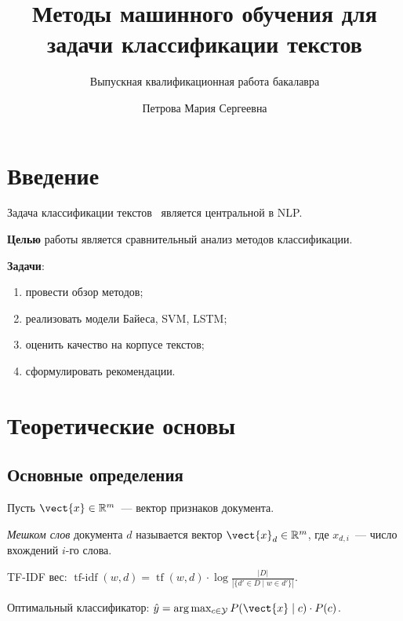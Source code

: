 \documentclass[font=modern]{cmcmsuthesis-bachelor}
\author{Петрова Мария Сергеевна}
\title{Методы машинного обучения для задачи
       классификации текстов}
\subtitle{Выпускная квалификационная работа бакалавра}
\begin{document}
\maketitle
\tableofcontents

\section*{Введение}

Задача классификации текстов~\cite{shannon1948} является центральной в NLP.

\textbf{Целью} работы является сравнительный анализ методов классификации.

\textbf{Задачи}:
\begin{enumerate}[beginpenalty=10000]
    \item провести обзор методов;
    \item реализовать модели Байеса, SVM, LSTM;
    \item оценить качество на корпусе текстов;
    \item сформулировать рекомендации.
\end{enumerate}

\section{Теоретические основы}\label{sec:theory}

\subsection{Основные определения}

Пусть $\vect{x} \in \mathbb{R}^m$~--- вектор признаков документа.

\begin{definition}\label{def:bow}
\emph{Мешком слов} документа $d$ называется вектор
$\vect{x}_d \in \mathbb{R}^m$, где $x_{d,i}$~--- число вхождений
$i$-го слова.
\end{definition}

\begin{definition}\label{def:tfidf}
TF-IDF вес: $\operatorname{tf\text{-}idf}(w,d) =
\operatorname{tf}(w,d)\cdot\log\frac{|D|}{|\{d'\in D\mid w\in d'\}|}$.
\end{definition}

\begin{theorem}\label{thm:bayes}
Оптимальный классификатор: $\hat{y} = \arg\max_{c\in\mathcal{Y}}
P(\vect{x}\mid c)\cdot P(c)$.
\end{theorem}
\end{document}

